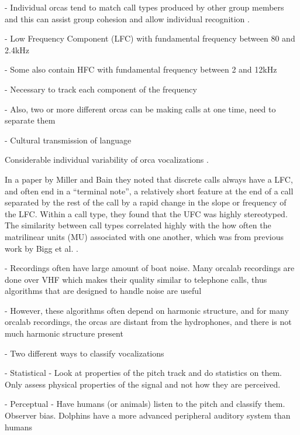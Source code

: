 \documentclass[12pt,oneside]{book}
\begin{document}
- Individual orcas tend to match call types produced by other group
members \cite{miller04} and this can assist group cohesion
\cite{miller02} and allow individual recognition \cite{miller07}.

- Low Frequency Component (LFC) with fundamental frequency between 80 and
2.4kHz

- Some also contain HFC with fundamental frequency between 2 and 12kHz
\cite{hoelzel86}

- Necessary to track each component of the frequency

- Also, two or more different orcas can be making calls at one time,
need to separate them \cite{ford87}

- Cultural transmission of language \cite{deeke99}

Considerable individual variability of orca vocalizations \cite{miller00}
\cite{nousek06} \cite{parijs04}.  

In a paper by Miller and Bain \cite{miller00} they noted that discrete
calls always have a LFC, and often end in a ``terminal note'', a
relatively short feature at the end of a call separated by the rest of
the call by a rapid change in the slope or frequency of the LFC.
Within a call type, they found that the UFC was highly stereotyped.
The similarity between call types correlated highly with the how often
the matrilinear units (MU) associated with one another, which was from
previous work by Bigg et al. \cite{bigg90}.



- Recordings often have large amount of boat noise.  Many orcalab
recordings are done over VHF which makes their quality similar to
telephone calls, thus algorithms that are designed to handle noise are
useful \cite{wang00}

- However, these algorithms often depend on harmonic structure, and
for many orcalab recordings, the orcas are distant from the
hydrophones, and there is not much harmonic structure present

- Two different ways to classify vocalizations \cite{deecke99}

   - Statistical - Look at properties of the pitch track and do
   statistics on them.  Only assess physical properties of the signal
   and not how they are perceived.

   - Perceptual - Have humans (or animals) listen to the pitch and
   classify them.  Observer bias.  Dolphins have a more advanced
   peripheral auditory system than humans \cite{au00}
\end{document}
